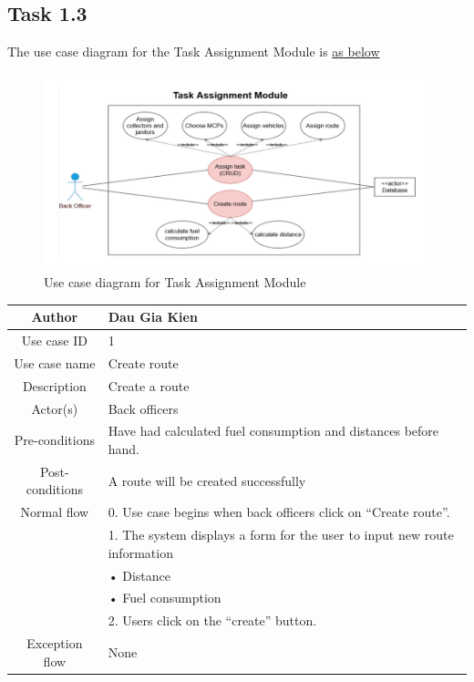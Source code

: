 \documentclass[a4paper]{article}
\begin{document}
\subsection{Task 1.3}
The use case diagram for the Task Assignment Module is \hyperlink{pic2}{as below}\\
\hypertarget{pic2}{
\begin{figure}
\centering
  \includegraphics[width=1\linewidth]{usecase-tam.png}
  \caption{Use case diagram for Task Assignment Module}
\end{figure}}
\begin{center}
\begin{tabular}{|c|m{35em}|}
    \hline
    Author & Dau Gia Kien \\
    \hline
    Use case ID & 1 \\
    \hline
    Use case name & Create route\\
    \hline
    Description & Create a route \\ 
    \hline
    Actor(s) & Back officers \\ 
    \hline
    Pre-conditions & Have had calculated fuel consumption and distances before hand. \\ 
    \hline
    Post-conditions & A route will be created successfully \\ 
    \hline
    Normal flow
&0. Use case begins when back officers click on “Create route”. \\
&1. The system displays a form for the user to input new route information \\
&\hspace{0.3cm}   • Distance \\
&\hspace{0.3cm}   • Fuel consumption \\
&2. Users click on the “create” button. \\
    \hline
    Exception flow & None \\ 
    \hline
\end{tabular}
\end{center}
\end{document}
